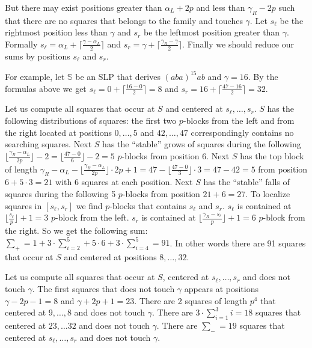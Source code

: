 \documentclass[11pt]{article}
\theoremstyle{break}
\newcommand{\slp}[1]{\mathbb{#1}}
\begin{document}
But there may exist positions greater than $\alpha_L + 2p$ and less than $\gamma_R - 2p$ such that
there are no squares that belongs to the family and touches $\gamma$. Let $s_{\ell}$ be the rightmost position less than $\gamma$ and
$s_r$ be the leftmost position greater than $\gamma$. Formally $s_\ell = \alpha_L + \lceil \frac{\gamma - \alpha_L}{2} \rceil$ and
$s_r = \gamma + \lceil \frac{\gamma_R - \gamma}{2} \rceil$. Finally we should reduce our sums by positions $s_\ell$ and $s_r$.

For example, let $\slp{S}$ be an SLP that derives $(aba)^{15}ab$ and $\gamma = 16$. By the formulas above we get $s_\ell = 0 + \lceil \frac{16 - 0}{2} \rceil = 8$
and $s_r = 16 + \lceil \frac{47 -16}{2} \rceil = 32$.

Let us compute all squares that occur at $S$ and centered at $s_\ell, \dots, s_r$. $S$ has the following distributions of squares:
the first two $p$-blocks from the left and from the right located at positions $0, \dots, 5$ and $42, \dots, 47$ correspondingly contains no searching squares.
Next $S$ has the ``stable'' grows of squares during the following $\lfloor \frac{\gamma_R -\alpha_L}{2p}\rfloor - 2 = \lfloor \frac{47 - 0}{6}\rfloor - 2 = 5$
$p$-blocks from position $6$. Next $S$ has the top block of length $\gamma_R - \alpha_L - \lfloor \frac{\gamma_R -\alpha_L}{2p}\rfloor \cdot 2p + 1 =
47 - \lfloor \frac{47 - 0}{3}\rfloor \cdot 3 = 47 - 42 = 5$ from position $6 + 5 \cdot 3 = 21$ with $6$ squares at each position. Next $S$ has the ``stable''
falls of squares during the following 5 $p$-blocks from position $21 + 6 = 27$. To localize squares in $[s_\ell, s_r]$ we find $p$-blocks that contains
$s_\ell$ and $s_r$. $s_\ell$ is contained at $\lfloor \frac{s_\ell}{p} \rfloor + 1 = 3$ $p$-block from the left. $s_r$ is contained at
$\lfloor \frac{\gamma_R - s_r}{p} \rfloor + 1 = 6$ $p$-block from the right. So we get the following sum:
$\sum_+ = 1 + 3 \cdot \sum_{i = 2}^5 + 5 \cdot 6 + 3 \cdot \sum_{i=4}^5 = 91$. In other words there are 91 squares that occur at $S$
and centered at positions $8, \dots, 32$.

Let us compute all squares that occur at $S$, centered at $s_\ell, \dots, s_r$ and does not touch $\gamma$. The first squares that does not touch $\gamma$
appears at positions $\gamma - 2p - 1 = 8$ and $\gamma + 2p + 1 = 23$. There are 2 squares of length $p^4$ that centered at $9, \dots, 8$ and does not touch $\gamma$.
There are $3 \cdot \sum_{i=1}^3 i = 18$ squares that centered at $23, \dots 32$ and does not touch $\gamma$. There are $\sum_- = 19$ squares that centered
at $s_\ell, \dots, s_r$ and does not touch $\gamma$.
\end{document}
